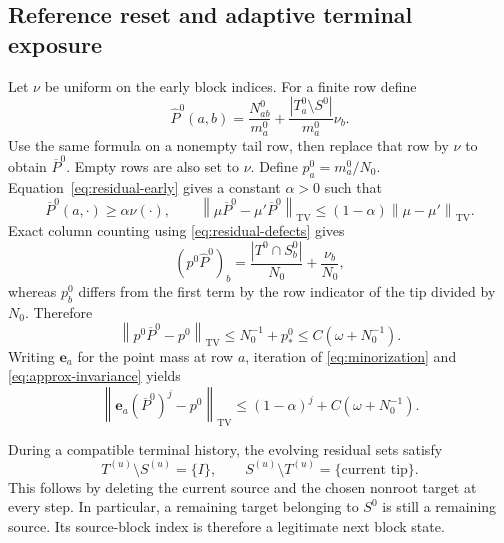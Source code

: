 \documentclass[11pt]{article}
\numberwithin{equation}{section}
\theoremstyle{definition}
\theoremstyle{remark}
\newcommand{\TV}{\mathrm{TV}}
\newcommand{\norm}[1]{\left\|#1\right\|}
\begin{document}
\subsection{Reference reset and adaptive terminal exposure}
Let $\nu$ be uniform on the early block indices. For a finite row define
\[
 \widehat P^0(a,b)=\frac{N_{ab}^0}{m_a^0}
       +\frac{|T_a^0\setminus S^0|}{m_a^0}\nu_b.
\]
Use the same formula on a nonempty tail row, then replace that row by $\nu$ to obtain $\overline P^0$. Empty rows are also set to $\nu$. Define $p_a^0=m_a^0/N_0$. Equation~\eqref{eq:residual-early} gives a constant $\alpha>0$ such that
\begin{equation}\label{eq:minorization}
 \overline P^0(a,\cdot)\ge\alpha\nu(\cdot),\qquad
 \norm{\mu\overline P^0-\mu'\overline P^0}_{\TV}
 \le(1-\alpha)\norm{\mu-\mu'}_{\TV}.
\end{equation}
Exact column counting using \eqref{eq:residual-defects} gives
\[
 (p^0\widehat P^0)_b=
 \frac{|T^0\cap S_b^0|}{N_0}+\frac{\nu_b}{N_0},
\]
whereas $p_b^0$ differs from the first term by the row indicator of the tip divided by $N_0$. Therefore
\begin{equation}\label{eq:approx-invariance}
 \norm{p^0\overline P^0-p^0}_{\TV}\le N_0^{-1}+p_*^0
 \le C(\omega+N_0^{-1}).
\end{equation}
Writing $\mathbf e_a$ for the point mass at row $a$, iteration of \eqref{eq:minorization} and \eqref{eq:approx-invariance} yields
\begin{equation}\label{eq:reset-mixing}
 \norm{\mathbf e_a(\overline P^0)^j-p^0}_{\TV}
 \le(1-\alpha)^j+C(\omega+N_0^{-1}).
\end{equation}

During a compatible terminal history, the evolving residual sets satisfy
\[
 T^{(u)}\setminus S^{(u)}=\{I\},\qquad
 S^{(u)}\setminus T^{(u)}=\{\text{current tip}\}.
\]
This follows by deleting the current source and the chosen nonroot target at every step. In particular, a remaining target belonging to $S^0$ is still a remaining source. Its source-block index is therefore a legitimate next block state.
\end{document}
